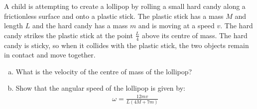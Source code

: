 \begin{solution}
\end{solution}

\question A child is attempting to create a lollipop by rolling a small hard candy along a frictionless surface and onto a plastic stick. The plastic stick has a mass $M$ and length $L$ and the hard candy has a mass $m$ and is moving at a speed $v$. The hard candy strikes the plastic stick at the point $\frac{L}{4}$ above its centre of mass. The hard candy is sticky, so when it collides with the plastic stick, the two objects remain in contact and move together. 
\begin{enumerate}[(a)]
\item What is the velocity of the centre of mass of the lollipop? 
\item Show that the angular speed of the lollipop is given by:
\begin{align*}
\omega = \frac{12mv}{L(4M+7m)}
\end{align*}
\end{enumerate}


